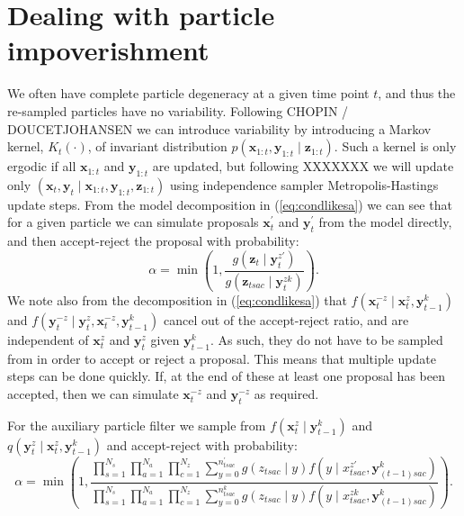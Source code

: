 \documentclass[a4paper]{article}
\newcommand{\bx}{\bm{x}}
\newcommand{\by}{\bm{y}}
\newcommand{\bz}{\bm{z}}
\begin{document}
\section{Dealing with particle impoverishment}

We often have complete particle degeneracy at a given time point $t$, and thus the re-sampled particles have no variability. Following CHOPIN / DOUCETJOHANSEN we can introduce variability by introducing a Markov kernel, $K_t(\cdot)$, of invariant distribution $p\left(\bx_{1:t}, \by_{1:t} \mid \bz_{1:t}\right)$. Such a kernel is only ergodic if all $\bx_{1:t}$ and $\by_{1:t}$ are updated, but following XXXXXXX we will update only $\left(\bx_t, \by_t \mid \bx_{1:t}, \by_{1:t}, \bz_{1:t}\right)$ using independence sampler Metropolis-Hastings update steps. From the model decomposition in (\ref{eq:condlikesa}) we can see that for a given particle we can simulate proposals $\bx_t^\prime$ and $\by_t^\prime$ from the model directly, and then accept-reject the proposal with probability:
\begin{equation}
    \alpha = \min\left(1, \frac{g\left(\bz_{t} \mid \by^{z\prime}_{t}\right)}{g\left(\bz_{tsac} \mid \by^{zk}_t\right)}\right).
\end{equation}
We note also from the decomposition in (\ref{eq:condlikesa}) that $f\left(\bx^{-z}_t \mid \bx^z_t, \by^k_{t - 1}\right)$ and $f\left(\by^{-z}_t \mid \by^z_t, \bx^{-z}_t, \by^k_{t - 1}\right)$ cancel out of the accept-reject ratio, and are independent of $\bx^z_t$ and $\by^z_t$ given $\by^k_{t - 1}$. As such, they do not have to be sampled from in order to accept or reject a proposal. This means that multiple update steps can be done quickly. If, at the end of these at least one proposal has been accepted, then we can simulate $\bx^{-z}_t$ and $\by^{-z}_t$ as required.

For the auxiliary particle filter we sample from $f\left(\bx^z_t \mid \by^k_{t - 1}\right)$ and $q\left(\by^z_t \mid \bx^z_t, \by^k_{t - 1}\right)$ and accept-reject with probability:
\begin{equation}
    \alpha = \min\left(1, \frac{\prod_{s = 1}^{N_s} \prod_{a = 1}^{N_a} \prod_{c = 1}^{N_z} \sum_{y = 0}^{n^\prime_{tsac}} g\left(z_{tsac} \mid y\right)f\left(y \mid x^{z\prime}_{tsac}, \by^k_{(t - 1)sac}\right)}{\prod_{s = 1}^{N_s} \prod_{a = 1}^{N_a} \prod_{c = 1}^{N_z} \sum_{y = 0}^{n^k_{tsac}} g\left(z_{tsac} \mid y\right)f\left(y \mid x^{zk}_{tsac}, \by^k_{(t - 1)sac}\right)}\right).
\end{equation}
\end{document}
